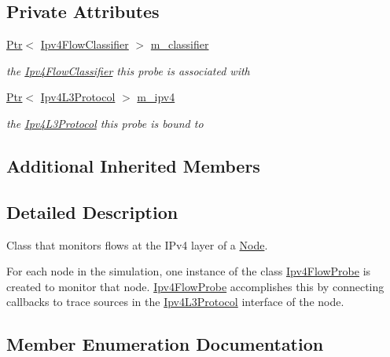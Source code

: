 \subsection*{Private Attributes}
\begin{DoxyCompactItemize}
\item 
\hyperlink{classns3_1_1Ptr}{Ptr}$<$ \hyperlink{classns3_1_1Ipv4FlowClassifier}{Ipv4\+Flow\+Classifier} $>$ \hyperlink{classns3_1_1Ipv4FlowProbe_ae4e260f1b2fa6cacbab3f6fec914172e}{m\+\_\+classifier}
\begin{DoxyCompactList}\small\item\em the \hyperlink{classns3_1_1Ipv4FlowClassifier}{Ipv4\+Flow\+Classifier} this probe is associated with \end{DoxyCompactList}\item 
\hyperlink{classns3_1_1Ptr}{Ptr}$<$ \hyperlink{classns3_1_1Ipv4L3Protocol}{Ipv4\+L3\+Protocol} $>$ \hyperlink{classns3_1_1Ipv4FlowProbe_a8902eb4356b3e4a0f91b9031f80c8802}{m\+\_\+ipv4}
\begin{DoxyCompactList}\small\item\em the \hyperlink{classns3_1_1Ipv4L3Protocol}{Ipv4\+L3\+Protocol} this probe is bound to \end{DoxyCompactList}\end{DoxyCompactItemize}
\subsection*{Additional Inherited Members}


\subsection{Detailed Description}
Class that monitors flows at the I\+Pv4 layer of a \hyperlink{classns3_1_1Node}{Node}. 

For each node in the simulation, one instance of the class \hyperlink{classns3_1_1Ipv4FlowProbe}{Ipv4\+Flow\+Probe} is created to monitor that node. \hyperlink{classns3_1_1Ipv4FlowProbe}{Ipv4\+Flow\+Probe} accomplishes this by connecting callbacks to trace sources in the \hyperlink{classns3_1_1Ipv4L3Protocol}{Ipv4\+L3\+Protocol} interface of the node. 

\subsection{Member Enumeration Documentation}
